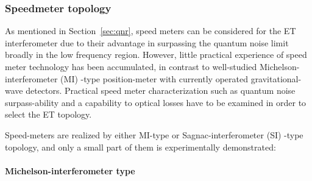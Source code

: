 


\FloatBarrier
\subsubsection{Speedmeter topology}

As mentioned in Section~\ref{sec:qnr},
speed meters can be considered for the ET interferometer
due to their advantage in surpassing the quantum noise limit broadly in the low frequency region.
However, little practical experience of speed meter technology has been accumulated,
in contrast to well-studied Michelson-interferometer (MI) -type position-meter
with currently operated gravitational-wave detectors.
Practical speed meter characterization such as quantum noise surpass-ability
and a capability to optical losses have to be examined in order to select the ET topology.

Speed-meters are realized by either MI-type or Sagnac-interferometer (SI) -type topology,
and only a small part of them is experimentally demonstrated:

\paragraph{Michelson-interferometer type}

